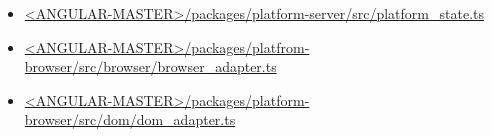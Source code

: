






\begin{itemize}
  \item \href{https://github.com/angular/angular/blob/master/packages/platform-server/src/platform_state.ts}
        {<ANGULAR-MASTER>/packages/platform-server/src/platform\_state.ts}
\end{itemize}





\begin{itemize}
  \item \href{https://github.com/angular/angular/blob/master/packages/platform-browser/src/browser/browser_adapter.ts}
        {<ANGULAR-MASTER>/packages/platfrom-browser/src/browser/browser\_adapter.ts}
\end{itemize}








\begin{itemize}
  \item \href{https://github.com/angular/angular/blob/master/packages/platform-browser/src/dom/dom_adapter.ts}
        {<ANGULAR-MASTER>/packages/platform-browser/src/dom/dom\_adapter.ts}
\end{itemize}






